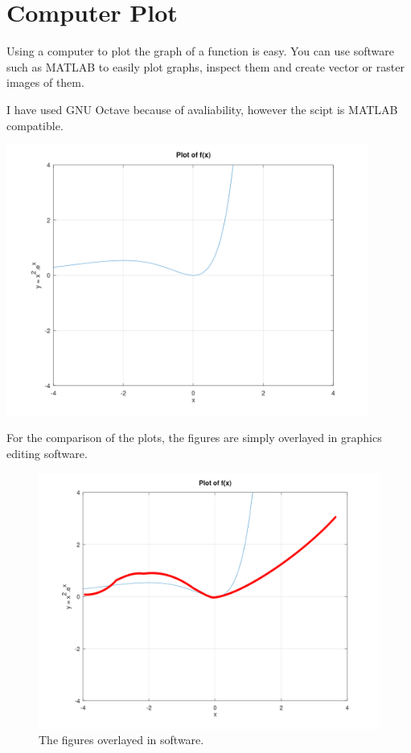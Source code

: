 \section{Computer Plot}

Using a computer to plot the graph of a function is easy. You can use
software such as MATLAB to easily plot graphs, inspect them and create
vector or raster images of them.

I have used GNU Octave because of avaliability, however the scipt is 
MATLAB compatible.



\begin{center}
\includegraphics[width=118.8mm]{computer/plot.png}
\end{center}

For the comparison of the plots, the figures are simply 
overlayed in graphics editing software.

\begin{figure}[h!]
    \centering
    \includegraphics[width=118.8mm]{computer/comparison.png}
    \caption{The figures overlayed in software.}
    \label{compare}
\end{figure}

